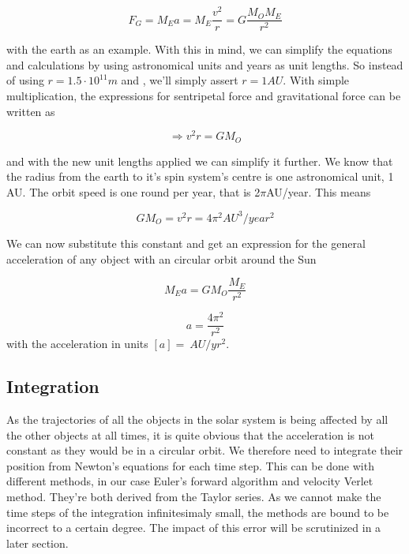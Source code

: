 \documentclass[10pt]{article}
\begin{document}
\begin{multicols}{2}
\begin{equation}
    F_G = M_Ea = M_E\frac{v^2}{r} = G\frac{M_OM_E}{r^2}
\end{equation}



with the earth as an example. With this in mind, we can simplify the
equations and calculations by using astronomical units and years as unit
lengths. So instead of using $r = 1.5\cdot10^{11}m$ and , we'll simply
assert $r = 1AU$. With simple multiplication, the expressions for
sentripetal force and gravitational force can be written as 

\begin{equation}
    \Rightarrow v^2r = GM_O
\end{equation}

and with the new unit lengths applied we can simplify it further. We know
that the radius from the earth to it's spin system's centre is one
astronomical unit, 1 AU. The orbit speed is one round per year, that is
2$\pi$AU/year. This means

\begin{equation}
    GM_O = v^2r = 4\pi^2AU^3/year^2
\end{equation}

We can now substitute this constant and get an expression for the general
acceleration of any object with an circular orbit around the Sun

\begin{equation}
    M_Ea = GM_O\frac{M_E}{r^2}
\end{equation}

\begin{equation}
    a = \frac{4\pi^2}{r^2}
\end{equation}
with the acceleration in units $[a] = \SI{}{AU/yr^2}$.

\subsection{Integration}
As the trajectories of all the objects in the solar system is being
affected by all the other objects at all times, it is quite obvious that
the acceleration is not constant as they would be in a circular orbit. We
therefore need to integrate their position from Newton's equations for each
time step. This can be done with different methods, in our case Euler's
forward algorithm and velocity Verlet method. They're both derived from the
Taylor series. As we cannot make the time steps of the integration
infinitesimaly small, the methods are bound to be incorrect to a certain
degree. The impact of this error will be scrutinized in a later section.


\end{multicols}
\end{document}
